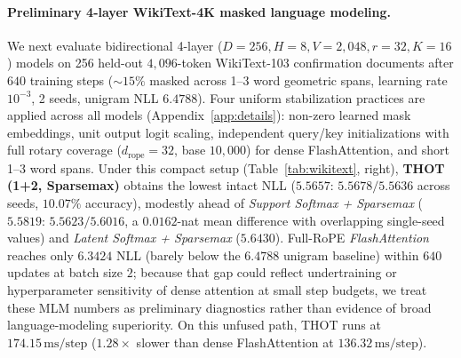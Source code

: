 \documentclass[11pt]{article}
\begin{document}
\paragraph{Preliminary 4-layer WikiText-4K masked language modeling.}
We next evaluate bidirectional 4-layer ($D=256, H=8, V=2{,}048, r=32, K=16$) models on 256 held-out $4{,}096$-token WikiText-103 confirmation documents after $640$ training steps ($\sim 15\%$ masked across 1--3 word geometric spans, learning rate $10^{-3}$, 2 seeds, unigram NLL $6.4788$). Four uniform stabilization practices are applied across all models (Appendix~\ref{app:details}): non-zero learned mask embeddings, unit output logit scaling, independent query/key initializations with full rotary coverage ($d_{\text{rope}}=32$, base $10{,}000$) for dense FlashAttention, and short 1--3 word spans. Under this compact setup (Table~\ref{tab:wikitext}, right), \textbf{THOT (1+2, Sparsemax)} obtains the lowest intact NLL (\textbf{$5.5657$}: $5.5678 / 5.5636$ across seeds, $10.07\%$ accuracy), modestly ahead of \emph{Support Softmax + Sparsemax} ($5.5819$: $5.5623 / 5.6016$, a $0.0162$-nat mean difference with overlapping single-seed values) and \emph{Latent Softmax + Sparsemax} ($5.6430$). Full-RoPE \emph{FlashAttention} reaches only $6.3424$ NLL (barely below the $6.4788$ unigram baseline) within $640$ updates at batch size $2$; because that gap could reflect undertraining or hyperparameter sensitivity of dense attention at small step budgets, we treat these MLM numbers as preliminary diagnostics rather than evidence of broad language-modeling superiority. On this unfused path, THOT runs at $174.15\,\text{ms/step}$ ($1.28\times$ slower than dense FlashAttention at $136.32\,\text{ms/step}$).
\end{document}
